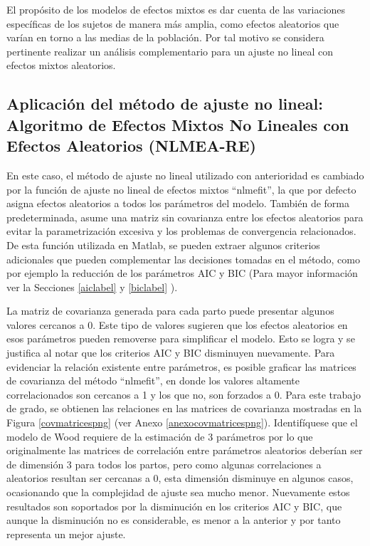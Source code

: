 El propósito de los modelos de efectos mixtos es dar cuenta de las variaciones específicas de los sujetos de manera más amplia, como efectos aleatorios que varían en torno a las medias de la población. Por tal motivo se considera pertinente realizar un análisis complementario para un ajuste no lineal con efectos mixtos aleatorios.


\subsection{Aplicación del método de ajuste no lineal: Algoritmo de Efectos Mixtos No Lineales con Efectos Aleatorios (NLMEA-RE)}

En este caso, el método de ajuste no lineal utilizado con anterioridad es cambiado por la función de ajuste no lineal de efectos mixtos ``nlmefit'', la que por defecto  asigna efectos aleatorios a todos los parámetros del modelo. También de forma predeterminada, asume una matriz sin covarianza entre los efectos aleatorios para evitar la parametrización excesiva y los problemas de convergencia relacionados. De esta función utilizada en Matlab, se pueden extraer algunos criterios adicionales que pueden complementar las decisiones tomadas en el método, como por ejemplo la reducción de los parámetros AIC y BIC (Para mayor información ver la Secciones \ref{aiclabel} y \ref{biclabel} ).

La matriz de covarianza generada para cada parto puede presentar algunos valores cercanos a 0. Este tipo de valores sugieren que los efectos aleatorios en esos parámetros pueden removerse para simplificar el modelo. Esto se logra y se justifica al notar que los criterios AIC y BIC disminuyen nuevamente. Para evidenciar la relación existente entre parámetros, es posible graficar las matrices de covarianza del método ``nlmefit'', en donde los valores altamente correlacionados son cercanos a 1 y los que no, son forzados a 0. Para este trabajo de grado, se obtienen las relaciones en las matrices de covarianza mostradas en la Figura  \ref{covmatricespng} (ver Anexo \ref{anexocovmatricespng}). Identifíquese que el modelo de Wood requiere de la estimación de 3 parámetros por lo que originalmente las matrices de correlación entre parámetros aleatorios deberían ser de dimensión 3 para todos los partos, pero como algunas correlaciones a aleatorios resultan ser cercanas a 0, esta dimensión disminuye en algunos casos, ocasionando que la complejidad de ajuste sea mucho menor. Nuevamente estos resultados son soportados por la disminución en los criterios AIC y BIC, que aunque la disminución no es considerable, es menor a la anterior y por tanto representa un mejor ajuste.

